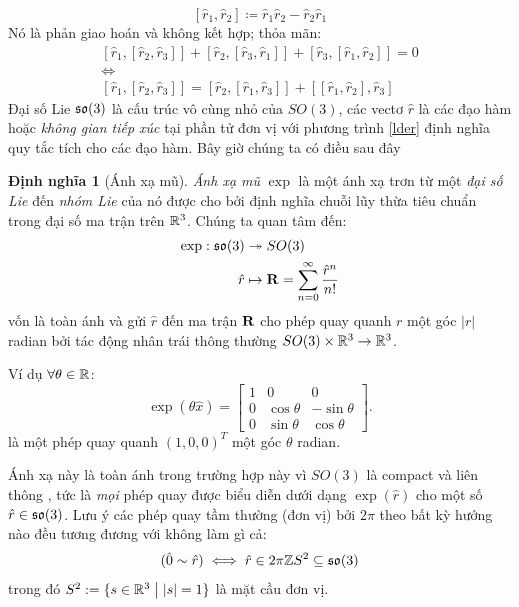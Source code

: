 \documentclass{article}
\theoremstyle{plain}
\theoremstyle{definition}
\newtheorem*{definition}{Định nghĩa}
\begin{document}
    \begin{equation}
        \left[\hat{r}_1,\hat{r}_2\right]\coloneqq\hat{r}_1\hat{r}_2-\hat{r}_2\hat{r}_1
    \end{equation}
    Nó là phản giao hoán và không kết hợp; thỏa mãn:
    \begin{gather}
        \left[\hat{r}_1,\left[\hat{r}_2,\hat{r}_3\right]\right]+\left[\hat{r}_2,\left[\hat{r}_3,\hat{r}_1\right]\right]+\left[\hat{r}_3,\left[\hat{r}_1,\hat{r}_2\right]\right]=0\nonumber\\
        \iff\nonumber\\
        \left[\hat{r}_1,\left[\hat{r}_2,\hat{r}_3\right]\right] = \left[\hat{r}_2,\left[\hat{r}_1,\hat{r}_3\right]\right] +\left[\left[\hat{r}_1,\hat{r}_2\right],\hat{r}_3\right]\label{lder}
    \end{gather}
    Đại số Lie $\mathfrak{so}(3)$ là cấu trúc vô cùng nhỏ của $SO(3)$, các vectơ $\hat{r}$ là các đạo hàm hoặc \emph{không gian tiếp xúc} tại phần tử đơn vị với phương trình \ref{lder} định nghĩa quy tắc tích cho các đạo hàm. 
    Bây giờ chúng ta có điều sau đây
    \begin{definition}[Ánh xạ mũ]
       \emph{Ánh xạ mũ} $\exp$ là một ánh xạ trơn từ một \emph{đại số Lie} đến \emph{nhóm Lie} của nó được cho bởi định nghĩa chuỗi lũy thừa tiêu chuẩn trong đại số ma trận trên $\mathbb{R}^3$.  Chúng ta quan tâm đến: 
       \begin{align}
            \exp:\mathfrak{so}(3)&\twoheadrightarrow SO(3)\\
            \hat{r}&\mapsto \mathbf{R}=\sum_{n=0}^\infty\frac{\hat{r}^n}{n!}\nonumber
        \end{align}
        vốn là toàn ánh và gửi $\hat{r}$ đến ma trận $\mathbf{R}$ cho phép quay quanh $r$ một góc $|r|$ radian bởi tác động nhân trái thông thường $SO(3)\times \mathbb{R}^3\to \mathbb{R}^3$.
    \end{definition}
    
     Ví dụ $\forall\theta\in\mathbb{R}$: 
    \begin{equation}
        \exp(\theta\hat{x}) = \begin{bmatrix}
        1 & 0 & 0 \\
        0 & \cos{\theta} & -\sin{\theta} \\
        0 & \sin{\theta} & \cos{\theta}
        \end{bmatrix}. 
    \end{equation}
    là một phép quay quanh $(1,0,0)^T$ một góc $\theta$ radian.
    
    Ánh xạ này là toàn ánh trong trường hợp này vì $SO(3)$ là compact và liên thông \cite[Cor. 11.10]{hall}, tức là \emph{mọi} phép quay được biểu diễn dưới dạng $\exp(\hat{r})$ cho một số $\hat{r}\in\mathfrak{so}(3)$.
    Lưu ý các phép quay tầm thường (đơn vị) bởi $2\pi$ theo bất kỳ hướng nào đều tương đương với không làm gì cả: 
    \begin{equation}
        (\hat{0} \sim \hat{r})\iff \hat{r} \in 2\pi\mathbb{Z} S^2\subseteq \mathfrak{so}(3)
    \end{equation}
    trong đó $S^2:=\{s\in \mathbb{R}^3\hspace{1mm}\big|\hspace{1mm} |s| = 1\}$ là mặt cầu đơn vị. 
    
\end{document}
